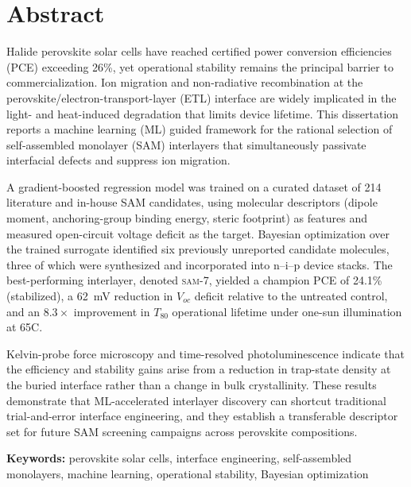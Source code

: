 \chapter*{Abstract}
\thispagestyle{plain}

Halide perovskite solar cells have reached certified power conversion
efficiencies (PCE) exceeding 26\%, yet operational stability remains the
principal barrier to commercialization. Ion migration and non-radiative
recombination at the perovskite/electron-transport-layer (ETL) interface are
widely implicated in the light- and heat-induced degradation that limits
device lifetime. This dissertation reports a machine learning (ML) guided
framework for the rational selection of self-assembled monolayer (SAM)
interlayers that simultaneously passivate interfacial defects and suppress
ion migration.

A gradient-boosted regression model was trained on a curated dataset of 214
literature and in-house SAM candidates, using molecular descriptors (dipole
moment, anchoring-group binding energy, steric footprint) as features and
measured open-circuit voltage deficit as the target. Bayesian optimization
over the trained surrogate identified six previously unreported candidate
molecules, three of which were synthesized and incorporated into
n--i--p device stacks. The best-performing interlayer, denoted
\textsc{sam-7}, yielded a champion PCE of 24.1\% (stabilized), a 62~mV
reduction in $V_{oc}$ deficit relative to the untreated control, and an
$8.3\times$ improvement in $T_{80}$ operational lifetime under
one-sun illumination at 65\textdegree C.

Kelvin-probe force microscopy and time-resolved photoluminescence indicate
that the efficiency and stability gains arise from a reduction in trap-state
density at the buried interface rather than a change in bulk crystallinity.
These results demonstrate that ML-accelerated interlayer discovery can
shortcut traditional trial-and-error interface engineering, and they
establish a transferable descriptor set for future SAM screening campaigns
across perovskite compositions.

\vspace{0.8cm}
\textbf{Keywords:} perovskite solar cells, interface engineering,
self-assembled monolayers, machine learning, operational stability,
Bayesian optimization

\clearpage

\tableofcontents
\clearpage
\listoffigures
\clearpage
\listoftables
\clearpage
